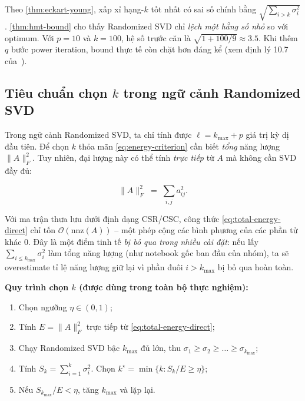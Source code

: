 \begin{remark}
Theo \cref{thm:eckart-young}, xấp xỉ hạng-$k$ tốt nhất có sai số chính bằng
$\sqrt{\sum_{i>k}\sigma_i^2}$. \cref{thm:hmt-bound} cho thấy Randomized SVD
chỉ \emph{lệch một hằng số nhỏ} so với optimum. Với $p = 10$ và $k = 100$,
hệ số trước căn là $\sqrt{1 + 100/9} \approx 3.5$. Khi thêm $q$ bước power
iteration, bound thực tế còn chặt hơn đáng kể (xem định lý 10.7
của~\cite{halko2011}).
\end{remark}

\subsection{Tiêu chuẩn chọn $k$ trong ngữ cảnh Randomized SVD}\label{subsec:k-selection}

Trong ngữ cảnh Randomized SVD, ta chỉ tính được $\ell = k_{\max} + p$ giá trị
kỳ dị đầu tiên. Để chọn $k$ thỏa mãn \eqref{eq:energy-criterion} cần biết
\emph{tổng} năng lượng $\|A\|_F^2$. Tuy nhiên, đại lượng này có thể tính
\emph{trực tiếp} từ $A$ mà không cần SVD đầy đủ:

\begin{equation}\label{eq:total-energy-direct}
    \|A\|_F^2 \;=\; \sum_{i, j} a_{ij}^2.
\end{equation}

Với ma trận thưa lưu dưới định dạng CSR/CSC, công thức
\eqref{eq:total-energy-direct} chỉ tốn $\mathcal{O}(\mathrm{nnz}(A))$ -- một
phép cộng các bình phương của các phần tử khác $0$. Đây là một điểm tinh tế
\emph{bị bỏ qua trong nhiều cài đặt}: nếu lấy
$\sum_{i \le k_{\max}}\sigma_i^2$ làm tổng năng lượng (như notebook gốc ban
đầu của nhóm), ta sẽ overestimate tỉ lệ năng lượng giữ lại vì phần đuôi
$i > k_{\max}$ bị bỏ qua hoàn toàn.

\medskip
\noindent\textbf{Quy trình chọn $k$ (được dùng trong toàn bộ thực nghiệm):}
\begin{enumerate}[label=(\arabic*)]
    \item Chọn ngưỡng $\eta \in (0, 1)$;
    \item Tính $E = \|A\|_F^2$ trực tiếp từ \eqref{eq:total-energy-direct};
    \item Chạy Randomized SVD bậc $k_{\max}$ đủ lớn, thu
          $\sigma_1 \ge \sigma_2 \ge \dots \ge \sigma_{k_{\max}}$;
    \item Tính $S_k = \sum_{i=1}^{k}\sigma_i^2$. Chọn
          $k^\star = \min\{k\colon S_k/E \ge \eta\}$;
    \item Nếu $S_{k_{\max}}/E < \eta$, tăng $k_{\max}$ và lặp lại.
\end{enumerate}

